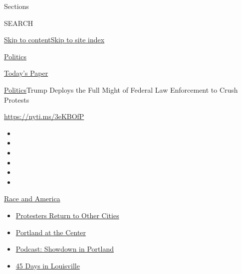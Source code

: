 Sections

SEARCH

\protect\hyperlink{site-content}{Skip to
content}\protect\hyperlink{site-index}{Skip to site index}

\href{https://www.nytimes.com/section/politics}{Politics}

\href{https://myaccount.nytimes.com/auth/login?response_type=cookie\&client_id=vi}{}

\href{https://www.nytimes.com/section/todayspaper}{Today's Paper}

\href{/section/politics}{Politics}\textbar{}Trump Deploys the Full Might
of Federal Law Enforcement to Crush Protests

\url{https://nyti.ms/3eKBOfP}

\begin{itemize}
\item
\item
\item
\item
\item
\item
\end{itemize}

\href{https://www.nytimes.com/news-event/george-floyd-protests-minneapolis-new-york-los-angeles?action=click\&pgtype=Article\&state=default\&region=TOP_BANNER\&context=storylines_menu}{Race
and America}

\begin{itemize}
\tightlist
\item
  \href{https://www.nytimes.com/2020/07/26/us/protests-portland-seattle-trump.html?action=click\&pgtype=Article\&state=default\&region=TOP_BANNER\&context=storylines_menu}{Protesters
  Return to Other Cities}
\item
  \href{https://www.nytimes.com/2020/07/24/us/portland-oregon-protests-white-race.html?action=click\&pgtype=Article\&state=default\&region=TOP_BANNER\&context=storylines_menu}{Portland
  at the Center}
\item
  \href{https://www.nytimes.com/2020/07/23/podcasts/the-daily/portland-protests.html?action=click\&pgtype=Article\&state=default\&region=TOP_BANNER\&context=storylines_menu}{Podcast:
  Showdown in Portland}
\item
  \href{https://www.nytimes.com/interactive/2020/07/16/us/black-lives-matter-protests-louisville-breonna-taylor.html?action=click\&pgtype=Article\&state=default\&region=TOP_BANNER\&context=storylines_menu}{45
  Days in Louisville}
\end{itemize}

